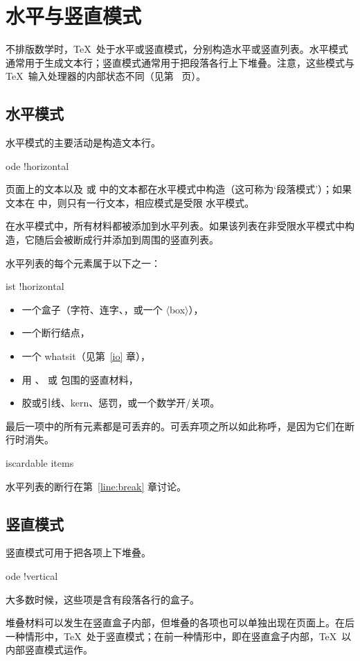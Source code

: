 \documentclass[a4paper]{rapport3}
\def\gr#1{$\langle$#1$\rangle$}\def\key#1{{\tt#1}}
\def\term#1\par{\index{#1}}
\begin{document}
\section{水平与竖直模式}

不排版数学时，\TeX\ 处于水平或竖直模式，分别构造水平或竖直列表。水平模式通常用于生成文本行；竖直模式通常用于把段落各行上下堆叠。注意，这些模式与 \TeX\ 输入处理器的内部状态不同（见第~\pageref{input:states} 页）。

\subsection{水平模式}

水平模式的主要活动是构造文本行。
\term mode !horizontal\par
页面上的文本以及  或  中的文本都在水平模式中构造（这可称为`段落模式'）；如果文本在  中，则只有一行文本，相应模式是受限
\awp
水平模式。

在水平模式中，所有材料都被添加到水平列表。如果该列表在非受限水平模式中构造，它随后会被断成行并添加到周围的竖直列表。

水平列表的每个元素属于以下之一：
\term list !horizontal\par
\begin{itemize} \item 一个盒子（字符、连字、，或一个 \gr{box}），
\item 一个断行结点，
\item 一个 whatsit（见第~\ref{io} 章），
\item 用 、 或  包围的竖直材料，
\item
\mdqon
胶或引线、kern、惩罚，或一个数学开/关项。
\mdqoff
\end{itemize}
最后一项中的所有元素都是可丢弃的。可丢弃项之所以如此称呼，是因为它们在断行时消失。
\term discardable items\par
水平列表的断行在第~\ref{line:break} 章讨论。

\subsection{竖直模式}

竖直模式可用于把各项上下堆叠。
\term mode !vertical\par
大多数时候，这些项是含有段落各行的盒子。

堆叠材料可以发生在竖直盒子内部，但堆叠的各项也可以单独出现在页面上。在后一种情形中，\TeX\ 处于竖直模式；在前一种情形中，即在竖直盒子内部，\TeX\ 以内部竖直模式运作。
\end{document}
